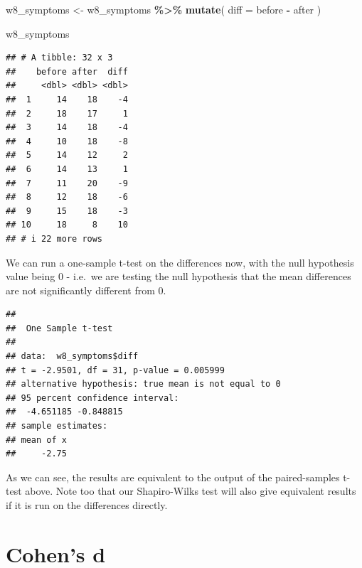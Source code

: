 \documentclass[
]{book}
\newenvironment{Shaded}{\begin{snugshade}}{\end{snugshade}}
\newcommand{\AttributeTok}[1]{\textcolor[rgb]{0.13,0.29,0.53}{#1}}
\newcommand{\DecValTok}[1]{\textcolor[rgb]{0.00,0.00,0.81}{#1}}
\newcommand{\FunctionTok}[1]{\textcolor[rgb]{0.13,0.29,0.53}{\textbf{#1}}}
\newcommand{\NormalTok}[1]{#1}
\newcommand{\OtherTok}[1]{\textcolor[rgb]{0.56,0.35,0.01}{#1}}
\newcommand{\SpecialCharTok}[1]{\textcolor[rgb]{0.81,0.36,0.00}{\textbf{#1}}}
\begin{document}
\begin{Shaded}
\begin{Highlighting}[]
\NormalTok{w8\_symptoms }\OtherTok{\textless{}{-}}\NormalTok{ w8\_symptoms }\SpecialCharTok{\%\textgreater{}\%}
  \FunctionTok{mutate}\NormalTok{(}
    \AttributeTok{diff =}\NormalTok{ before }\SpecialCharTok{{-}}\NormalTok{ after}
\NormalTok{  )}

\NormalTok{w8\_symptoms}
\end{Highlighting}
\end{Shaded}

\begin{verbatim}
## # A tibble: 32 x 3
##    before after  diff
##     <dbl> <dbl> <dbl>
##  1     14    18    -4
##  2     18    17     1
##  3     14    18    -4
##  4     10    18    -8
##  5     14    12     2
##  6     14    13     1
##  7     11    20    -9
##  8     12    18    -6
##  9     15    18    -3
## 10     18     8    10
## # i 22 more rows
\end{verbatim}

We can run a one-sample t-test on the differences now, with the null hypothesis value being 0 - i.e.~we are testing the null hypothesis that the mean differences are not significantly different from 0.

\begin{Shaded}
\end{Shaded}

\begin{verbatim}
## 
##  One Sample t-test
## 
## data:  w8_symptoms$diff
## t = -2.9501, df = 31, p-value = 0.005999
## alternative hypothesis: true mean is not equal to 0
## 95 percent confidence interval:
##  -4.651185 -0.848815
## sample estimates:
## mean of x 
##     -2.75
\end{verbatim}

As we can see, the results are equivalent to the output of the paired-samples t-test above. Note too that our Shapiro-Wilks test will also give equivalent results if it is run on the differences directly.

\hypertarget{cohens-d}{%
\section{Cohen's d}\label{cohens-d}}
\end{document}
